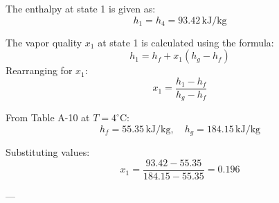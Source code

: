 The enthalpy at state 1 is given as:  
\[
h_1 = h_4 = 93.42 \, \text{kJ/kg}
\]  

The vapor quality \( x_1 \) at state 1 is calculated using the formula:  
\[
h_1 = h_f + x_1 (h_g - h_f)
\]  
Rearranging for \( x_1 \):  
\[
x_1 = \frac{h_1 - h_f}{h_g - h_f}
\]  

From Table A-10 at \( T = 4^\circ\text{C} \):  
\[
h_f = 55.35 \, \text{kJ/kg}, \quad h_g = 184.15 \, \text{kJ/kg}
\]  

Substituting values:  
\[
x_1 = \frac{93.42 - 55.35}{184.15 - 55.35} = 0.196
\]  

---